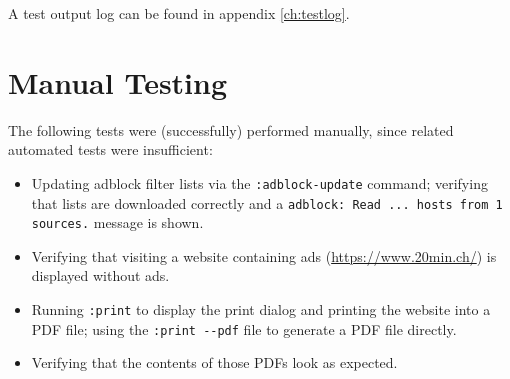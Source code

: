 A test output log can be found in appendix \ref{ch:testlog}.

\section{Manual Testing}
The following tests were (successfully) performed manually, since related
automated tests were insufficient:

\begin{itemize}[parsep=5pt]
  \item Updating adblock filter lists via the \verb|:adblock-update| command;
    verifying that lists are downloaded correctly and a \texttt{adblock: Read ...
    hosts from 1 sources.} message is shown.
  \item Verifying that visiting a website containing ads
    (\url{https://www.20min.ch/}) is displayed without ads.
  \item Running \verb|:print| to display the print dialog and printing the
    website into a PDF file; using the \verb|:print --pdf| file to generate a
    PDF file directly.
  \item Verifying that the contents of those PDFs look as expected.
\end{itemize}
